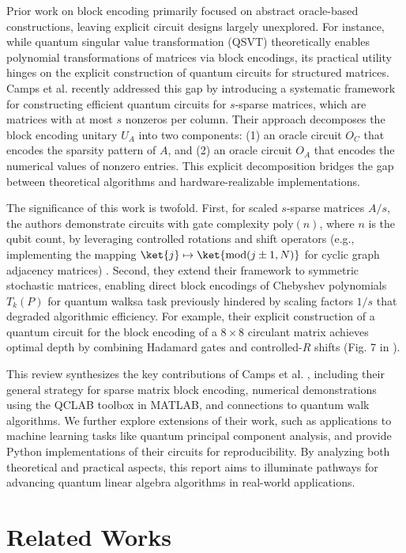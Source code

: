 \documentclass{article}
\begin{document}
    Prior work on block encoding primarily focused on abstract oracle-based constructions, leaving explicit circuit designs largely unexplored. For instance, while quantum singular value transformation (QSVT) \cite{Gilyen2019} theoretically enables polynomial transformations of matrices via block encodings, its practical utility hinges on the explicit construction of quantum circuits for structured matrices. Camps et al. \cite{EQC} recently addressed this gap by introducing a systematic framework for constructing efficient quantum circuits for $s$-sparse matrices, which are matrices with at most $s$ nonzeros per column. Their approach decomposes the block encoding unitary $U_A$ into two components: (1) an oracle circuit $O_C$ that encodes the sparsity pattern of $A$, and (2) an oracle circuit $O_A$ that encodes the numerical values of nonzero entries. This explicit decomposition bridges the gap between theoretical algorithms and hardware-realizable implementations.

    The significance of this work is twofold. First, for scaled $s$-sparse matrices $A/s$, the authors demonstrate circuits with gate complexity $\text{poly}(n)$, where $n$ is the qubit count, by leveraging controlled rotations and shift operators (e.g., implementing the mapping $\ket{j} \mapsto \ket{\text{mod}(j \pm 1, N)}$ for cyclic graph adjacency matrices) \cite{EQC}. Second, they extend their framework to symmetric stochastic matrices, enabling direct block encodings of Chebyshev polynomials $T_k(P)$ for quantum walks\textemdash a task previously hindered by scaling factors $1/s$ that degraded algorithmic efficiency. For example, their explicit construction of a quantum circuit for the block encoding of a $8 \times 8$ circulant matrix achieves optimal depth by combining Hadamard gates and controlled-$R$ shifts (Fig. 7 in \cite{EQC}).

    This review synthesizes the key contributions of Camps et al. \cite{EQC}, including their general strategy for sparse matrix block encoding, numerical demonstrations using the QCLAB toolbox in MATLAB, and connections to quantum walk algorithms. We further explore extensions of their work, such as applications to machine learning tasks like quantum principal component analysis, and provide Python implementations of their circuits for reproducibility. By analyzing both theoretical and practical aspects, this report aims to illuminate pathways for advancing quantum linear algebra algorithms in real-world applications.


    \section{Related Works}
\end{document}
